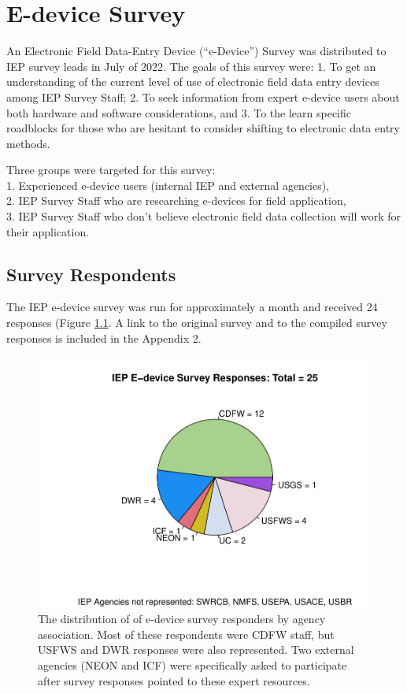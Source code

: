 \documentclass[
]{book}
\theoremstyle{definition}
\theoremstyle{definition}
\theoremstyle{definition}
\theoremstyle{definition}
\theoremstyle{remark}
\begin{document}
\hypertarget{cross}{%
\chapter{E-device Survey}\label{cross}}

An Electronic Field Data-Entry Device (``e-Device'') Survey was distributed to IEP survey leads in July of 2022. The goals of this survey were: 1. To get an understanding of the current level of use of electronic field data entry devices among IEP Survey Staff; 2. To seek information from expert e-device users about both hardware and software considerations, and 3. To the learn specific roadblocks for those who are hesitant to consider shifting to electronic data entry methods.

Three groups were targeted for this survey:\\
1. Experienced e-device users (internal IEP and external agencies),\\
2. IEP Survey Staff who are researching e-devices for field application,\\
3. IEP Survey Staff who don't believe electronic field data collection will work for their application.

\hypertarget{survey-respondents}{%
\section{Survey Respondents}\label{survey-respondents}}

The IEP e-device survey was run for approximately a month and received 24 responses (Figure \ref{fig:survey}. A link to the original survey and to the compiled survey responses is included in the Appendix 2.

\begin{figure}

{\centering \includegraphics[width=0.8\linewidth]{02-survey_files/figure-latex/survey-1} 

}

\caption{The distribution of of e-device survey responders by agency association. Most of these respondents were CDFW staff, but USFWS and DWR responses were also represented.  Two external agencies (NEON and ICF) were specifically asked to participate after survey responses pointed to these expert resources.}\label{fig:survey}
\end{figure}
\end{document}

